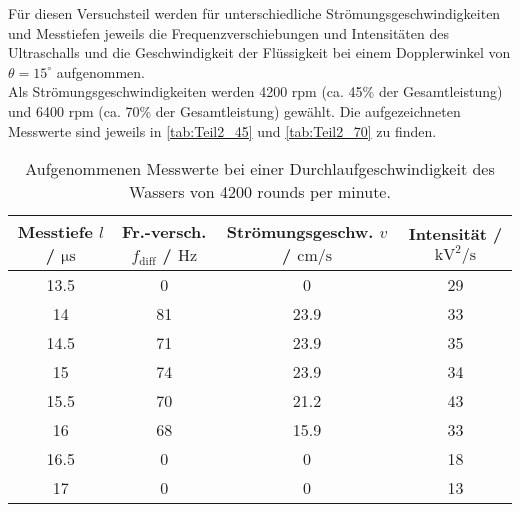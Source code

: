 Für diesen Versuchsteil werden für unterschiedliche Strömungsgeschwindigkeiten und Messtiefen jeweils die
Frequenzverschiebungen und Intensitäten des Ultraschalls und die Geschwindigkeit der Flüssigkeit
bei einem Dopplerwinkel von $\theta = 15^{\circ}$ aufgenommen.\\
Als Strömungsgeschwindigkeiten werden 4200 rpm (ca. 45\% der Gesamtleistung) und 6400 rpm (ca. 70\% der
Gesamtleistung) gewählt. Die aufgezeichneten Messwerte sind jeweils in \autoref{tab:Teil2_45} und 
\autoref{tab:Teil2_70} zu finden.\\

\begin{table}
  \centering
  \begin{tabular}{c | c | c | c}
    \toprule
    Messtiefe $l$ / $\si{\micro\second}$ & Fr.-versch. $f_{\mathrm{diff}}$ / $\si{\hertz}$ & Strömungsgeschw. $v$ / $\si{\centi\meter\per\second}$ & Intensität / $\si{\kilo\volt\squared\per\second}$ \\
    \midrule
    13.5        &    0      &     0         &      29\\
    14          &    81     &     23.9      &      33\\
    14.5        &    71     &     23.9      &      35\\
    15          &    74     &     23.9      &      34\\
    15.5        &    70     &     21.2      &      43\\
    16          &    68     &     15.9      &      33\\
    16.5        &    0      &     0         &      18\\
    17          &    0      &     0         &      13\\
    \bottomrule
  \end{tabular}
  \caption{Aufgenommenen Messwerte bei einer Durchlaufgeschwindigkeit des Wassers von 4200 rounds per minute.}
  \label{tab:Teil2_45}
\end{table}

